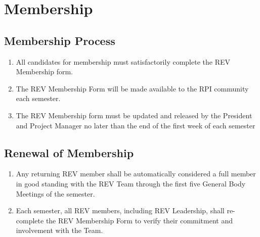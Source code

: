 \section{Membership}
\label{membership}

\subsection{Membership Process}
\label{membership:process}

\begin{enumerate}
\item All candidates for membership must satisfactorily complete the REV Membership form.
\item The REV Membership Form will be made available to the RPI community each semester.
\item The REV Membership form must be updated and released by the President and Project Manager no later than the end of the first week of each semester
\end{enumerate}

\subsection{Renewal of Membership}
\label{membership:renewal}

\begin{enumerate}
\item Any returning REV member shall be automatically considered a full member in good standing with the REV Team through the first five General Body Meetings of the semester.
\item Each semester, all REV members, including REV Leadership, shall re-complete the REV Membership Form to verify their commitment and involvement with the Team.
\end{enumerate}
